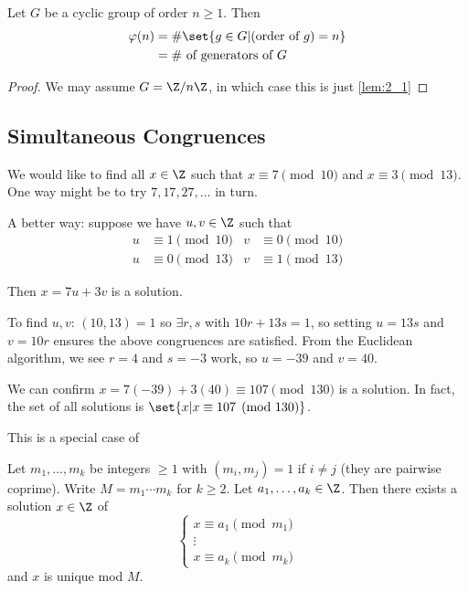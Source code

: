 \documentclass{article}
\begin{document}

\begin{nlemma}\label{lem:2_2}
    Let $G$ be a cyclic group of order $n \geq 1$. Then
    \begin{align*}
        \varphi (n) &=  \# \set{g \in G | (\text{order of } g) = n} \\
                    &=  \# \text{ of generators of } G
    \end{align*}
\end{nlemma}

\begin{proof}
    We may assume $G = \Z/ n \Z$, in which case this is just \cref{lem:2_1}
\end{proof}

\subsection{Simultaneous Congruences}

\begin{eg}
    We would like to find all $x \in \Z$ such that $x \equiv 7 \pmod{10}$ and $x \equiv 3 \pmod{13}$.
    One way might be to try $7, 17, 27, \dotsc$ in turn.

    A better way: suppose we have $u, v \in \Z$ such that
    \begin{align*}
        u &\equiv 1 \pmod{10} & v &\equiv 0 \pmod{10} \\
        u &\equiv 0 \pmod{13} & v &\equiv 1 \pmod{13}
    \end{align*}

    Then $x = 7u + 3v$ is a solution.

    To find $u, v$: $(10, 13) = 1$ so $\exists r, s$ with $10r + 13s = 1$, so setting $u=13s$ and $v=10r$ ensures the above congruences are satisfied.
    From the Euclidean algorithm, we see $r=4$ and $s=-3$ work, so $u=-39$ and $v=40$.

    We can confirm  $x = 7(-39) + 3(40) \equiv 107 \pmod{130}$ is a solution.
    In fact, the set of all solutions is $ \set{ x | x \equiv 107 \pmod {130}} $.
\end{eg}

This is a special case of

\begin{thm}
    Let $m_1, \dotsc, m_k$ be integers $\geq 1$ with $(m_i, m_j) = 1$ if $i \neq j$ (they are pairwise coprime).
    Write $M = m_1 \dotsm m_k$ for $k \geq 2$. Let $a_1, \dotsc, a_k \in \Z$. Then there exists a solution $x \in \Z$ of
    \begin{equation}\label{eq:crt}
        \begin{cases}
            x \equiv a_1 \pmod{m_1} \\ \vdots \\ x \equiv a_k \pmod{m_k}
        \end{cases}
    \end{equation}
    and $x$ is unique mod $M$.
\end{thm}
\end{document}
